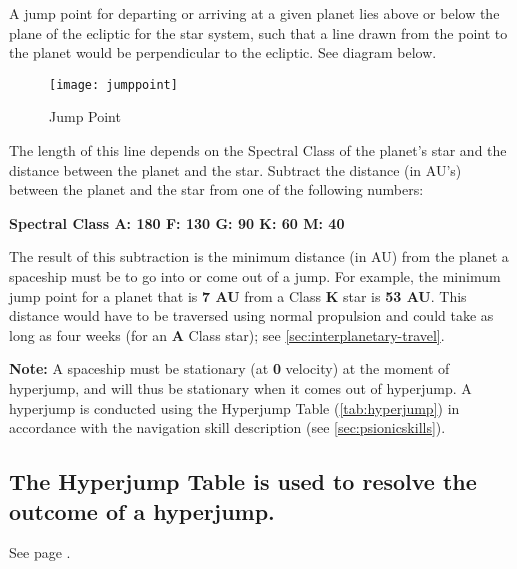 A jump point for departing or arriving at a given planet lies above or
below the plane of the ecliptic for the star system, such that a line
drawn from the point to the planet would be perpendicular to the
ecliptic.  See diagram below.


\begin{figure}[htbp]
  \centering
  \texttt{[image: jumppoint]}
  \caption{Jump Point}
  \label{fig:jump-point}
\end{figure}

The length of this line depends on the Spectral Class of the planet's
star and the distance between the planet and the star. Subtract the
distance (in AU's) between the planet and the star from one of the
following numbers:

\textbf{Spectral Class A: 180 F: 130 G: 90 K: 60 M: 40}

The result of this subtraction is the minimum distance (in AU) from
the planet a spaceship must be to go into or come out of a jump.  For
example, the minimum jump point for a planet that is \textbf{7 AU}
from a Class \textbf{K} star is \textbf{53 AU}. This distance would
have to be traversed using normal propulsion and could take as long as
four weeks (for an \textbf{A} Class star); see \ref{sec:interplanetary-travel}.

\textbf{Note:} A spaceship must be stationary (at \textbf{0} velocity) at the
moment of hyperjump, and will thus be stationary when it comes out of
hyperjump. A hyperjump is conducted using the Hyperjump Table
(\ref{tab:hyperjump}) in accordance with the navigation skill description
(see \ref{sec:psionicskills}).

\subsection[Hyperjump Table]{The Hyperjump Table is used to resolve
  the outcome of a 
  hyperjump.}
\label{sec:hyperjump-table}

See page \pageref{tab:hyperjump}.


